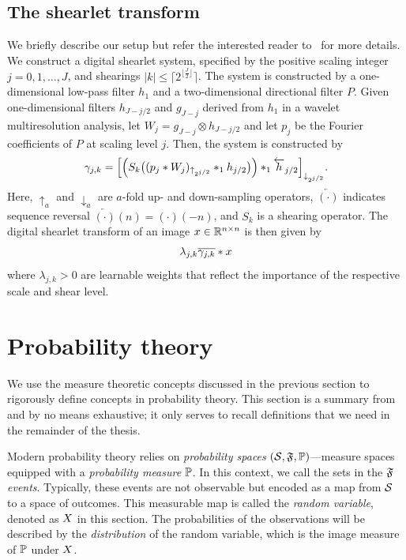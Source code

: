 \subsection{The shearlet transform}
\label{ssec:shearlet transform}
We briefly describe our setup but refer the interested reader to~\cite{kutyniok_shearlab_2016,lim_nonseparable_2013} for more details.
We construct a digital shearlet system, specified by the positive scaling integer \( j = \num{0}, \num{1}, \dotsc, J \), and shearings \( |k| \leq \lceil 2^{\lfloor \frac{J}{2} \rfloor}\rceil \).
The system is constructed by a one-dimensional low-pass filter \( h_{\num{1}} \) and a two-dimensional directional filter \( P \).
Given one-dimensional filters \( h_{J-j/2} \) and \( g_{J-j} \)  derived from \( h_{\num{1}} \) in a wavelet multiresolution analysis, let \( W_j = g_{J-j} \otimes h_{J-j/2} \) and let \( p_j \) be the Fourier coefficients of \( P \) at scaling level \( j \).
Then, the system is constructed by
\begin{equation}
	\gamma_{j,k} = \Bigl[ \Bigl( S_k\bigl( (p_j * W_j)_{\uparrow_{2^{j/2}}} *_1 h_{j/2} \bigr) \Bigr) *_1 \overleftarrow{h}_{j/2} \Bigr]_{\downarrow_{2^{j/2}}}.
\end{equation}
Here, \( \uparrow_{a} \) and \( \downarrow_{a} \) are \( a \)-fold up- and down-sampling operators, \( \overleftarrow{(\cdot)} \) indicates sequence reversal \( \overleftarrow{(\cdot)}(n) = (\cdot)(-n) \), and \( S_k \) is a shearing operator.
The digital shearlet transform of an image \( x \in \mathbb{R}^{n \times n} \) is then given by
\begin{equation}
	\lambda_{j,k} \overline{\gamma_{j, k}} * x
\end{equation}
where \( \lambda_{j,k} > \num{0} \) are learnable weights that reflect the importance of the respective scale and shear level.
\section{Probability theory}
We use the measure theoretic concepts discussed in the previous section to rigorously define concepts in probability theory.
This section is a summary from~\cite{Klenke2014} and by no means exhaustive; it only serves to recall definitions that we need in the remainder of the thesis.

Modern probability theory relies on \emph{probability spaces} \( (\mathcal{S}, \mathfrak{F}, \mathbb{P}) \)---measure spaces equipped with a \emph{probability measure} \( \mathbb{P} \).
In this context, we call the sets in the \SigmaAlgebra{} \( \mathfrak{F} \) \emph{events}.
Typically, these events are not observable but encoded as a map from \( \mathcal{S} \) to a space of outcomes.
This measurable map is called the \emph{random variable}, denoted as \( X \) in this section.
The probabilities of the observations will be described by the \emph{distribution} of the random variable, which is the image measure of \( \mathbb{P} \) under \( X \).

